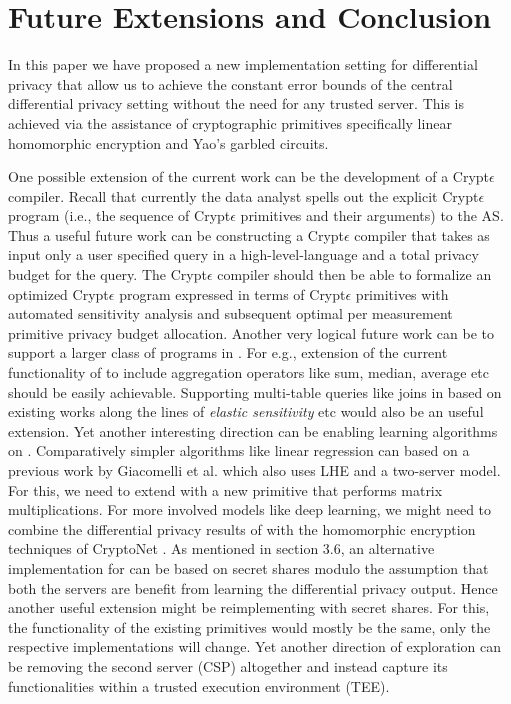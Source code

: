 
\section{Future Extensions and Conclusion}
In this paper we have proposed a new implementation setting for differential privacy that allow us to achieve the constant error bounds of the central differential privacy setting without the need for any trusted server. This is achieved via the assistance of cryptographic primitives specifically linear homomorphic encryption and Yao's garbled circuits. 
\par  One possible extension of the current work can be the development of a
Crypt$\epsilon$ compiler. Recall that currently the data analyst spells out the explicit Crypt$\epsilon$ program  (i.e., the sequence of Crypt$\epsilon$ primitives and their arguments) to the \textsf{AS}. Thus a useful future work can be constructing a Crypt$\epsilon$ compiler that takes as input only a user specified query in a high-level-language and a total privacy budget for the query. The Crypt$\epsilon$
compiler should then be able to formalize an optimized Crypt$\epsilon$ program expressed in terms of Crypt$\epsilon$ primitives with automated sensitivity analysis and subsequent optimal per measurement primitive privacy budget allocation. 
Another very logical future work can be to support a larger class of programs in \system. For e.g., extension of the current functionality of \system to include aggregation operators like sum, median, average etc should be easily achievable. Supporting  multi-table queries like joins in \system based on existing works along the lines of \emph{elastic sensitivity} \cite{elastic} etc would also be an useful extension.  Yet another interesting direction can be enabling learning algorithms on \system.   Comparatively simpler algorithms like linear regression can based on a previous work by  Giacomelli et al. \cite{LReg} which also uses \textsf{LHE} and a two-server model. For this, we need to extend \system with a new primitive that performs matrix multiplications. For more involved models like deep learning, we might need to combine the differential privacy results of \cite{DLDP} with the homomorphic encryption techniques of  CryptoNet \cite{CryptoNet}. As mentioned in section 3.6, an alternative implementation for \system  can be based on secret shares modulo the assumption that both the servers are benefit from learning the differential privacy output. Hence another useful extension might be reimplementing \system with  secret shares. For this, the functionality of the existing primitives would mostly be the same, only the respective implementations will change. 
Yet another direction of exploration can be removing the second server (\textsf{CSP}) altogether and instead capture its functionalities within a trusted execution environment (TEE).
